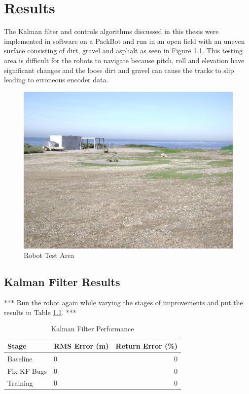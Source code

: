 \chapter{Results}
\label{ch:results}
The Kalman filter and controls algorithms discussed in this thesis were implemented in software on a PackBot and run in an open field with an uneven surface consisting of dirt, gravel and asphalt as seen in Figure \ref{fig:resultsTestArea}. This testing area is difficult for the robots to navigate because pitch, roll and elevation have significant changes and the loose dirt and gravel can cause the tracks to slip leading to erroneous encoder data.

\begin{figure}[ht!]
	\centering
	\includegraphics[width=.75\textwidth]{images/flightFieldTestArea}
	\caption{Robot Test Area}
	\label{fig:resultsTestArea}
\end{figure}

\section{Kalman Filter Results}
\label{sec:kfResults}
*** Run the robot again while varying the stages of improvements and put the results in Table \ref{tab:resultsKF}. ***
\begin{table}[ht!]
\caption{Kalman Filter Performance}
\small
\centering
\begin{tabular}{@{}llr@{}} \toprule
Stage       & RMS Error (m)  & Return Error (\%) \\ \midrule
Baseline    & 0              & 0                 \\
Fix KF Bugs & 0              & 0                 \\
Training    & 0              & 0                 \\ \bottomrule
\end{tabular}
\label{tab:resultsKF}
\end{table}

